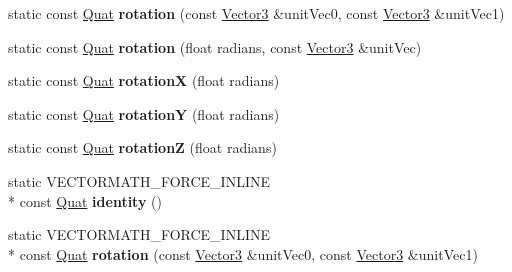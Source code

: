 \begin{DoxyCompactItemize}
\item 
\hypertarget{class_vectormath_1_1_aos_1_1_quat_ad4d8db2b4c7f290e92ab2d29e122f9a6}{static const \hyperlink{class_vectormath_1_1_aos_1_1_quat}{Quat} {\bfseries rotation} (const \hyperlink{class_vectormath_1_1_aos_1_1_vector3}{Vector3} \&unit\+Vec0, const \hyperlink{class_vectormath_1_1_aos_1_1_vector3}{Vector3} \&unit\+Vec1)}\label{class_vectormath_1_1_aos_1_1_quat_ad4d8db2b4c7f290e92ab2d29e122f9a6}

\item 
\hypertarget{class_vectormath_1_1_aos_1_1_quat_a9e5f2d1f8fcce1ad4b74ec55ea872ec3}{static const \hyperlink{class_vectormath_1_1_aos_1_1_quat}{Quat} {\bfseries rotation} (float radians, const \hyperlink{class_vectormath_1_1_aos_1_1_vector3}{Vector3} \&unit\+Vec)}\label{class_vectormath_1_1_aos_1_1_quat_a9e5f2d1f8fcce1ad4b74ec55ea872ec3}

\item 
\hypertarget{class_vectormath_1_1_aos_1_1_quat_aacd4310a21602a1041c8d563e1e02781}{static const \hyperlink{class_vectormath_1_1_aos_1_1_quat}{Quat} {\bfseries rotation\+X} (float radians)}\label{class_vectormath_1_1_aos_1_1_quat_aacd4310a21602a1041c8d563e1e02781}

\item 
\hypertarget{class_vectormath_1_1_aos_1_1_quat_a74de33fd4592ac97d102e9334bb6f29b}{static const \hyperlink{class_vectormath_1_1_aos_1_1_quat}{Quat} {\bfseries rotation\+Y} (float radians)}\label{class_vectormath_1_1_aos_1_1_quat_a74de33fd4592ac97d102e9334bb6f29b}

\item 
\hypertarget{class_vectormath_1_1_aos_1_1_quat_a7bc308b781629e197acb388b0e40a725}{static const \hyperlink{class_vectormath_1_1_aos_1_1_quat}{Quat} {\bfseries rotation\+Z} (float radians)}\label{class_vectormath_1_1_aos_1_1_quat_a7bc308b781629e197acb388b0e40a725}

\item 
\hypertarget{class_vectormath_1_1_aos_1_1_quat_a1d016bcafbde5c1cc3018d870740936c}{static V\+E\+C\+T\+O\+R\+M\+A\+T\+H\+\_\+\+F\+O\+R\+C\+E\+\_\+\+I\+N\+L\+I\+N\+E \\*
const \hyperlink{class_vectormath_1_1_aos_1_1_quat}{Quat} {\bfseries identity} ()}\label{class_vectormath_1_1_aos_1_1_quat_a1d016bcafbde5c1cc3018d870740936c}

\item 
\hypertarget{class_vectormath_1_1_aos_1_1_quat_a6cfb51e0a0d165f180c27f2a14c45267}{static V\+E\+C\+T\+O\+R\+M\+A\+T\+H\+\_\+\+F\+O\+R\+C\+E\+\_\+\+I\+N\+L\+I\+N\+E \\*
const \hyperlink{class_vectormath_1_1_aos_1_1_quat}{Quat} {\bfseries rotation} (const \hyperlink{class_vectormath_1_1_aos_1_1_vector3}{Vector3} \&unit\+Vec0, const \hyperlink{class_vectormath_1_1_aos_1_1_vector3}{Vector3} \&unit\+Vec1)}\label{class_vectormath_1_1_aos_1_1_quat_a6cfb51e0a0d165f180c27f2a14c45267}


\end{DoxyCompactItemize}
